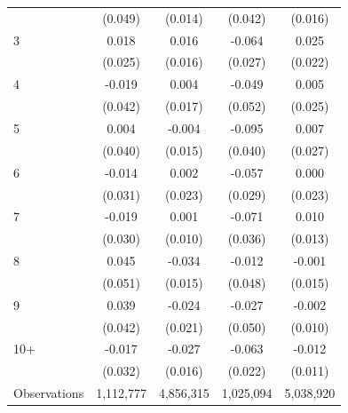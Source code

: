 \begin{table}[htbp]
\begin{tabular}{l*{4}{c}}
            &     (0.049)         &     (0.014)         &     (0.042)         &     (0.016)         \\
[1em]
3           &       0.018         &       0.016         &      -0.064\sym{**} &       0.025         \\
            &     (0.025)         &     (0.016)         &     (0.027)         &     (0.022)         \\
[1em]
4           &      -0.019         &       0.004         &      -0.049         &       0.005         \\
            &     (0.042)         &     (0.017)         &     (0.052)         &     (0.025)         \\
[1em]
5           &       0.004         &      -0.004         &      -0.095\sym{**} &       0.007         \\
            &     (0.040)         &     (0.015)         &     (0.040)         &     (0.027)         \\
[1em]
6           &      -0.014         &       0.002         &      -0.057\sym{*}  &       0.000         \\
            &     (0.031)         &     (0.023)         &     (0.029)         &     (0.023)         \\
[1em]
7           &      -0.019         &       0.001         &      -0.071\sym{**} &       0.010         \\
            &     (0.030)         &     (0.010)         &     (0.036)         &     (0.013)         \\
[1em]
8           &       0.045         &      -0.034\sym{**} &      -0.012         &      -0.001         \\
            &     (0.051)         &     (0.015)         &     (0.048)         &     (0.015)         \\
[1em]
9           &       0.039         &      -0.024         &      -0.027         &      -0.002         \\
            &     (0.042)         &     (0.021)         &     (0.050)         &     (0.010)         \\
[1em]
10+         &      -0.017         &      -0.027\sym{*}  &      -0.063\sym{***}&      -0.012         \\
            &     (0.032)         &     (0.016)         &     (0.022)         &     (0.011)         \\
\hline
Observations&   1,112,777         &   4,856,315         &   1,025,094         &   5,038,920         \\

\end{tabular}
\end{table}
